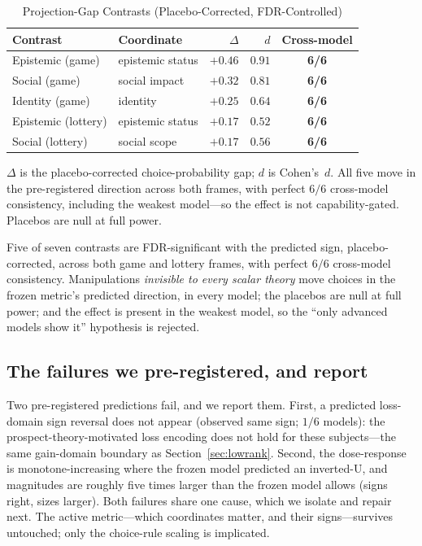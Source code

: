 \documentclass[journal]{IEEEtran}
\begin{document}
\begin{table}[!t]
\renewcommand{\arraystretch}{1.15}
\caption{Projection-Gap Contrasts (Placebo-Corrected, FDR-Controlled)}
\label{tab:projgap}
\centering
\footnotesize
\begin{tabular}{@{}l l r r c@{}}
\toprule
\textbf{Contrast} & \textbf{Coordinate} & \textbf{$\Delta$} & \textbf{$d$} & \textbf{Cross-model} \\
\midrule
Epistemic (game)    & epistemic status & $+0.46$ & $0.91$ & \textbf{6/6} \\
Social (game)       & social impact    & $+0.32$ & $0.81$ & \textbf{6/6} \\
Identity (game)     & identity         & $+0.25$ & $0.64$ & \textbf{6/6} \\
Epistemic (lottery) & epistemic status & $+0.17$ & $0.52$ & \textbf{6/6} \\
Social (lottery)    & social scope     & $+0.17$ & $0.56$ & \textbf{6/6} \\
\bottomrule
\end{tabular}
\begin{flushleft}
\footnotesize{$\Delta$ is the placebo-corrected choice-probability gap; $d$ is Cohen's~$d$. All five move in the pre-registered direction across both frames, with perfect $6/6$ cross-model consistency, including the weakest model---so the effect is not capability-gated. Placebos are null at full power.}
\end{flushleft}
\end{table}

Five of seven contrasts are FDR-significant with the predicted sign, placebo-corrected, across both game and lottery frames, with perfect $6/6$ cross-model consistency.
Manipulations \emph{invisible to every scalar theory} move choices in the frozen metric's predicted direction, in every model; the placebos are null at full power; and the effect is present in the weakest model, so the ``only advanced models show it'' hypothesis is rejected.

\subsection{The failures we pre-registered, and report}
Two pre-registered predictions fail, and we report them.
First, a predicted loss-domain sign reversal does not appear (observed same sign; $1/6$ models): the prospect-theory-motivated loss encoding does not hold for these subjects---the same gain-domain boundary as Section~\ref{sec:lowrank}.
Second, the dose-response is monotone-increasing where the frozen model predicted an inverted-U, and magnitudes are roughly five times larger than the frozen model allows (signs right, sizes larger).
Both failures share one cause, which we isolate and repair next.
The active metric---which coordinates matter, and their signs---survives untouched; only the choice-rule scaling is implicated.
\end{document}
